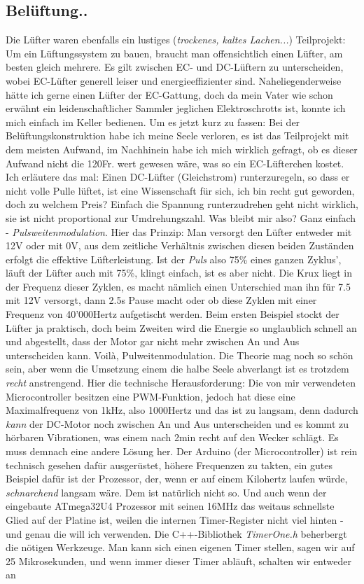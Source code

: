 \documentclass[12pt,titlepage,a4paper]{article}
\begin{document}
\subsection{Belüftung..}
Die Lüfter waren ebenfalls ein lustiges (\textit{trockenes, kaltes Lachen...}) Teilprojekt: Um ein Lüftungssystem zu bauen, braucht man offensichtlich einen Lüfter, am besten gleich mehrere. Es gilt zwischen EC- und DC-Lüftern zu unterscheiden, wobei EC-Lüfter generell leiser und energieeffizienter sind. Naheliegenderweise hätte ich gerne einen Lüfter der EC-Gattung, doch da mein Vater wie schon erwähnt ein leidenschaftlicher Sammler jeglichen Elektroschrotts ist, konnte ich mich einfach im Keller bedienen. Um es jetzt kurz zu fassen: Bei der Belüftungskonstruktion habe ich meine Seele verloren, es ist das Teilprojekt mit dem meisten Aufwand, im Nachhinein habe ich mich wirklich gefragt, ob es dieser Aufwand nicht die 120Fr. wert gewesen wäre, was so ein EC-Lüfterchen kostet. Ich erläutere das mal: Einen DC-Lüfter (Gleichstrom) runterzuregeln, so dass er nicht volle Pulle lüftet, ist eine Wissenschaft für sich, ich bin recht gut geworden, doch zu welchem Preis? Einfach die Spannung runterzudrehen geht nicht wirklich, sie ist nicht proportional zur Umdrehungszahl. Was bleibt mir also? Ganz einfach - \textit{Pulsweitenmodulation}. Hier das Prinzip: Man versorgt den Lüfter entweder mit 12V oder mit 0V, aus dem zeitliche Verhältnis zwischen diesen beiden Zuständen erfolgt die effektive Lüfterleistung. Ist der \textit{Puls} also 75\% eines ganzen Zyklus', läuft der Lüfter auch mit 75\%, klingt einfach, ist es aber nicht. Die Krux liegt in der Frequenz dieser Zyklen, es macht nämlich einen Unterschied man ihn für 7.5 mit 12V versorgt, dann 2.5s Pause macht oder ob diese Zyklen mit einer Frequenz von 40'000Hertz aufgetischt werden. Beim ersten Beispiel stockt der Lüfter ja praktisch, doch beim Zweiten wird die Energie so unglaublich schnell an und abgestellt, dass der Motor gar nicht mehr zwischen An und Aus unterscheiden kann. Voilà, Pulweitenmodulation. \n Die Theorie mag noch so schön sein, aber wenn die Umsetzung einem die halbe Seele abverlangt ist es trotzdem \textit{recht} anstrengend. Hier die technische Herausforderung: Die von mir verwendeten Microcontroller besitzen eine PWM-Funktion, jedoch hat diese eine Maximalfrequenz von 1kHz, also 1000Hertz und das ist zu langsam, denn dadurch \textit{kann} der DC-Motor noch zwischen An und Aus unterscheiden und es kommt zu hörbaren Vibrationen, was einem nach 2min recht auf den Wecker schlägt. Es muss demnach eine andere Lösung her. Der Arduino (der Microcontroller) ist rein technisch gesehen dafür ausgerüstet, höhere Frequenzen zu takten, ein gutes Beispiel dafür ist der Prozessor, der, wenn er auf einem Kilohertz laufen würde, \textit{schnarchend} langsam wäre. Dem ist natürlich nicht so. Und auch wenn der eingebaute ATmega32U4 Prozessor mit seinen 16MHz das weitaus schnellste Glied auf der Platine ist, weilen die internen Timer-Register nicht viel hinten - und genau die will ich verwenden. Die C++-Bibliothek \textit{TimerOne.h} beherbergt die nötigen Werkzeuge. Man kann sich einen eigenen Timer stellen, sagen wir auf 25 Mikrosekunden, und wenn immer dieser Timer abläuft, schalten wir entweder an 
\end{document}
